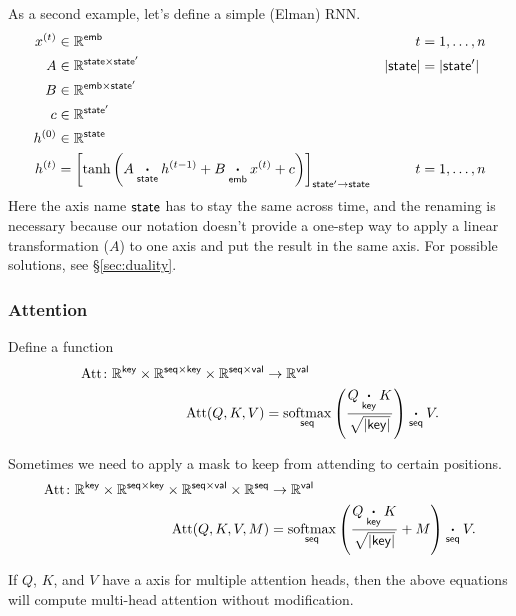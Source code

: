 \documentclass{article}
\begin{document}
As a second example, let's define a simple (Elman) RNN.
\begin{align*}
x^{(t)} &\in \mathbb{R}^{\name{emb}} & t &= 1, \ldots, n \\
A &\in \mathbb{R}^{\name{state} \times \name{state'}} & |\name{state}| &= |\name{state'}| \\
B &\in \mathbb{R}^{\name{emb} \times \name{state'}} \\
c &\in \mathbb{R}^{\name{state'}} \\
h^{(0)} &\in \mathbb{R}^{\name{state}} \\
h^{(t)} &= \nmov{state'}{state}{\tanh\left( A \ndot{state} h^{(t-1)} + B \ndot{emb} x^{(t)} + c \right)} & t &= 1, \ldots, n
\end{align*}
Here the axis name $\name{state}$ has to stay the same across time, and the renaming is necessary because our notation doesn't provide a one-step way to apply a linear transformation ($A$) to one axis and put the result in the same axis. For possible solutions, see \S\ref{sec:duality}.

\subsubsection{Attention}
\label{sec:attention}

Define a function
\begin{align*}
  \text{Att} \colon \mathbb{R}^{\name{key}} \times \mathbb{R}^{\name{seq} \times\name{key}} \times \mathbb{R}^{\name{seq} \times\name{val}} &\rightarrow \mathbb{R}^{\name{val}} \\
  \text{Att}(Q,K,V) &= \nfun{seq}{softmax} \left( \frac{Q \ndot{key} K}{\sqrt{|\name{key}|}} \right) \ndot{seq} V.
\end{align*}

Sometimes we need to apply a mask to keep from attending to certain positions.
\begin{align*}
  \text{Att} \colon \mathbb{R}^{\name{key}} \times \mathbb{R}^{\name{seq} \times\name{key}} \times \mathbb{R}^{\name{seq} \times\name{val}} \times \mathbb{R}^{\name{seq}} &\rightarrow \mathbb{R}^{\name{val}} \\
\text{Att}(Q, K, V, M) &= \nfun{seq}{softmax} \left( \frac{Q \ndot{key} K}{\sqrt{|\name{key}|}} + M \right) \ndot{seq} V.
\end{align*}

If $Q$, $K$, and $V$ have a  axis for multiple attention heads, then the above equations will compute multi-head attention without modification.
\end{document}
